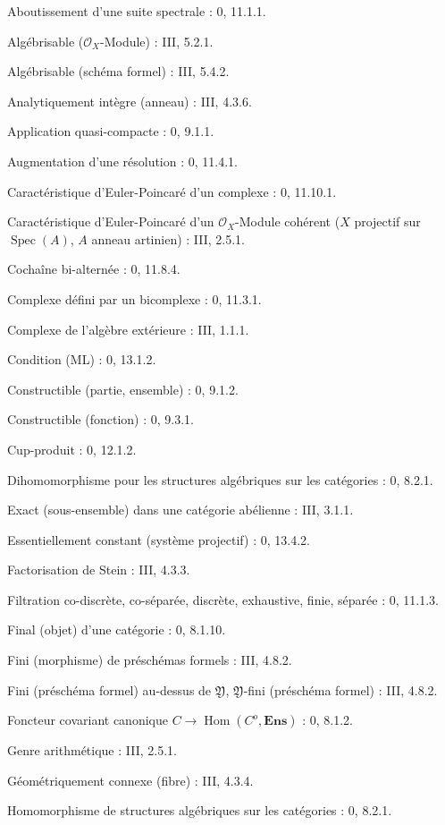 \begin{flushleft}
Aboutissement d'une suite spectrale : 0, 11.1.1.

Algébrisable ($\mathcal O_X$-Module) : III, 5.2.1.

Algébrisable (schéma formel) : III, 5.4.2.

Analytiquement intègre (anneau) : III, 4.3.6.

Application quasi-compacte : 0, 9.1.1.

Augmentation d'une résolution : 0, 11.4.1.

Caractéristique d'Euler-Poincaré d'un complexe : 0, 11.10.1.

Caractéristique d'Euler-Poincaré d'un $\mathcal O_X$-Module cohérent ($X$
projectif sur $\operatorname{Spec}(A)$, $A$ anneau artinien) : III, 2.5.1.

Cochaîne bi-alternée : 0, 11.8.4.

Complexe défini par un bicomplexe : 0, 11.3.1.

Complexe de l'algèbre extérieure : III, 1.1.1.

Condition (ML) : 0, 13.1.2.

Constructible (partie, ensemble) : 0, 9.1.2.

Constructible (fonction) : 0, 9.3.1.

Cup-produit : 0, 12.1.2.

Dihomomorphisme pour les structures algébriques sur les catégories : 0, 8.2.1.

Exact (sous-ensemble) dans une catégorie abélienne : III, 3.1.1.

Essentiellement constant (système projectif) : 0, 13.4.2.

Factorisation de Stein : III, 4.3.3.

Filtration co-discrète, co-séparée, discrète, exhaustive, finie, séparée :
0, 11.1.3.

Final (objet) d'une catégorie : 0, 8.1.10.

Fini (morphisme) de préschémas formels : III, 4.8.2.

Fini (préschéma formel) au-dessus de $\mathfrak Y$,
$\mathfrak Y$-fini (préschéma formel) : III, 4.8.2.

Foncteur covariant canonique $C\to\operatorname{Hom}(C^o,\mathbf{Ens})$ :
0, 8.1.2.

Genre arithmétique : III, 2.5.1.

Géométriquement connexe (fibre) : III, 4.3.4.

Homomorphisme de structures algébriques sur les catégories : 0, 8.2.1.


\end{flushleft}
